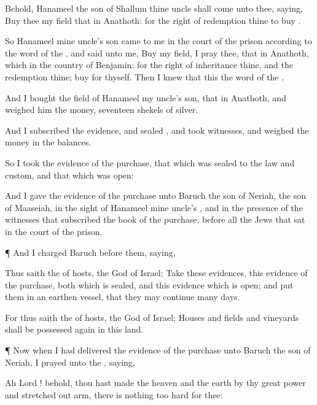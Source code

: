 {Behold,
Hanameel the
son of
Shallum thine
uncle shall
come unto thee,
saying,
Buy thee my
field that
{} in
Anathoth: for the
right of
redemption
{} thine to
buy
{}.

So
Hanameel mine
uncle’s
son
came to me in the
court of the
prison according to the
word of the
{}, and
said unto me,
Buy my
field, I pray thee, that
{} in
Anathoth, which
{} in the
country of
Benjamin: for the
right of
inheritance
{} thine, and the
redemption
{} thine;
buy
{} for thyself. Then I
knew that this
{} the
word of the
{}.

And I
bought the
field of
Hanameel my
uncle’s
son, that
{} in
Anathoth, and
weighed him the
money,
{}
seventeen
shekels of
silver.

And I
subscribed the
evidence, and
sealed
{}, and
took
witnesses, and
weighed
{} the
money in the
balances.

So I
took the
evidence of the
purchase,
{} that which was
sealed
{} to the
law and
custom, and that which was
open:

And I
gave the
evidence of the
purchase unto
Baruch the
son of
Neriah, the
son of
Maaseiah, in the
sight of
Hanameel mine
uncle’s
{}, and in the
presence of the
witnesses that
subscribed the
book of the
purchase,
before all the
Jews that
sat in the
court of the
prison.


\par }{\PP {}¶ And I
charged
Baruch
before them,
saying,

Thus
saith the
{} of
hosts, the
God of
Israel;
Take these
evidences, this
evidence of the
purchase, both which is
sealed, and this
evidence which is
open; and
put them in an
earthen
vessel, that they may
continue
many
days.

For thus
saith the
{} of
hosts, the
God of
Israel;
Houses and
fields and
vineyards shall be possessed
again in this
land.


\par }{\PP {}¶ Now
when I had
delivered the
evidence of the
purchase unto
Baruch the
son of
Neriah, I
prayed unto the
{},
saying,

Ah
Lord
{}! behold, thou hast
made the
heaven and the
earth by thy
great
power and stretched
out
arm,
{} there is
nothing too
hard for thee:

}
